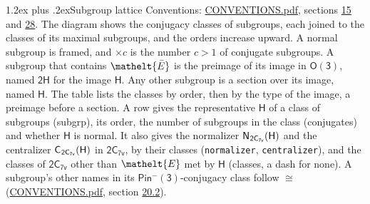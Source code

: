 \documentclass[10pt,a4paper]{article}
\makeatletter
\renewcommand\section{\@startsection{section}{1}{\z@}{-3ex plus -1ex minus -.2ex}%
  {1.2ex plus .2ex}{\normalfont\large\sffamily\bfseries\color{parttitle}}}
\numberwithin{equation}{section}
\newcommand{\eltfont}[1]{{\let\sigma\eltsigma\mathelt{#1}}}
\newcommand{\grp}[1]{\mathsf{#1}}
\newcommand{\cls}[1]{\eltfont{#1}}
\newcommand{\elt}[1]{\eltfont{#1}}
\newcommand{\samecls}{\cong}
\newcommand{\nconj}[1]{{\scriptsize$\times#1$}}
\newcommand{\barred}[1]{\bar{#1}}
\newcommand{\hairsp}{\mkern1mu}
\makeatother
\begin{document}
\section{Subgroup lattice}\label{s:subgroups}
Conventions: \href{../../CONVENTIONS.pdf}{CONVENTIONS.pdf}, sections \href{../../../rotation/CONVENTIONS.pdf\#conv.15}{15} and \href{../../CONVENTIONS.pdf\#conv.28}{28}.
The diagram shows the conjugacy classes of subgroups, each joined to the classes of its maximal subgroups, and the orders increase upward. A normal subgroup is framed, and ${\times}c$ is the number $c > 1$ of conjugate subgroups. \label{n:group.H}A subgroup that contains $\elt{\barred{E}}$ is the preimage of its image in $\grp{O(3)}$, named $\grp{2H}$ for the image $\grp{H}$. Any other subgroup is a section over its image, named $\grp{H}$. The table lists the classes by order, then by the type of the image, a preimage before a section. \label{n:head.subgroup}\label{n:head.order}\label{n:head.conjugates}\label{n:head.normal}A row gives the representative $\grp{H}$ of a class of subgroups (subgrp), its order, the number of subgroups in the class (conjugates) and whether $\grp{H}$ is normal. \label{n:group.normalizer}\label{n:group.centralizer}\label{n:head.classes}It also gives the normalizer $\grp{N}_{\hairsp \grp{2C_{7v}}}(\grp{H})$ and the centralizer $\grp{C}_{\hairsp \grp{2C_{7v}}}(\grp{H})$ in $\grp{2C_{7v}}$, by their classes (\texttt{normalizer}, \texttt{centralizer}), and the classes of $\grp{2C_{7v}}$ other than $\cls{E}$ met by $\grp{H}$ (classes, a dash for none). A subgroup's other names in its \href{Pinminus3.pdf}{$\grp{Pin^{-}(3)}$}-conjugacy class follow $\samecls$ (\href{../../CONVENTIONS.pdf}{CONVENTIONS.pdf}, section \href{../../CONVENTIONS.pdf\#conv.20.2}{20.2}).
\begin{center}
\end{center}
\end{document}
